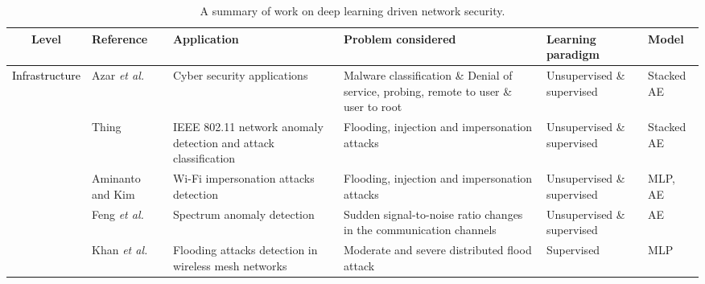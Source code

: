 \documentclass[journal,comsoc,letter]{IEEEtran}
\newcommand{\edit}[1]{\textcolor{black}{#1}}
\begin{document}
\begin{table*}[h!]
\centering
\caption{A summary of work on deep learning driven network security.}
\label{tab:security}
\begin{tabular}{|c|C{2.1cm}|C{3.3cm}|C{6cm}|C{1.7cm}|C{1.7cm}|}
\hline
\textbf{Level}                        & \textbf{Reference}                                       & \textbf{Application}                                            & \textbf{Problem considered}                                                                                                           & \textbf{Learning paradigm} & \textbf{Model}                                           \\ \hline
\multirow{12}{*}{\edit{Infrastructure}} & Azar \emph{et al.} \cite{yousefi2017autoencoder}         & Cyber security applications                                     & Malware classification \& Denial of service, probing, remote to user \& user to root                                                  & Unsupervised \& supervised & Stacked AE                                               \\  
                                      & Thing \cite{thing2017ieee}                               & IEEE 802.11 network anomaly detection and attack classification & Flooding, injection and impersonation attacks                                                                                          & Unsupervised \& supervised & Stacked AE                                               \\  
                                      & Aminanto and Kim \cite{aminanto2016detecting}            & Wi-Fi impersonation attacks detection                            & Flooding, injection and impersonation attacks                                                                                          & Unsupervised \& supervised & MLP, AE                                                  \\  
                                      & Feng \emph{et al.} \cite{feng2016anomaly}                & Spectrum anomaly detection                                      & Sudden signal-to-noise ratio changes in the communication channels                                                                                                        & Unsupervised \& supervised & AE                                                       \\  
                                      & Khan \emph{et al.} \cite{khan2016distributed}            & Flooding attacks detection in wireless mesh networks             & Moderate and severe distributed flood attack                                                                                      & Supervised                 & MLP                                                      \\  

\end{tabular}
\end{table*}
\end{document}
